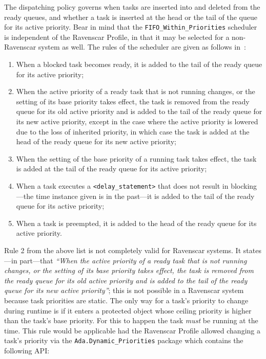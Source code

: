 The dispatching policy governs when tasks are inserted into and
deleted from the ready queues, and whether a task is inserted at the
head or the tail of the queue for its active priority. Bear in mind
that the \texttt{FIFO\_Within\_Priorities} scheduler is independent of
the Ravenscar Profile, in that it may be selected for a non-Ravenscar
system as well. The rules of the scheduler are given as follows
in~\cite{arm05}:

\begin{enumerate}
\item{When a blocked task becomes ready, it is added to the tail of
  the ready queue for its active priority;}
\item{When the active priority of a ready task that is not running
  changes, or the setting of its base priority takes effect, the task
  is removed from the ready queue for its old active priority and is
  added to the tail of the ready queue for its new active priority,
  except in the case where the active priority is lowered due to the
  loss of inherited priority, in which case the task is added at the
  head of the ready queue for its new active priority;}
\item{When the setting of the base priority of a running task takes
  effect, the task is added at the tail of the ready queue for its
  active priority;}
\item{When a task executes a \texttt{<delay\_statement>} that does not
  result in blocking---the time instance given is in the past---it is
  added to the tail of the ready queue for its active priority;}
\item{When a task is preempted, it is added to the head of the ready
  queue for its active priority.}
\end{enumerate}

Rule 2 from the above list is not completely valid for Ravenscar
systems. It states---in part---that \emph{``When the active priority
  of a ready task that is not running changes, or the setting of its
  base priority takes effect, the task is removed from the ready queue
  for its old active priority and is added to the tail of the ready
  queue for its new active priority''}; this is not possible in a
Ravenscar system because task priorities are static. The only way for
a task's priority to change during runtime is if it enters a protected
object whose ceiling priority is higher than the task's base
priority. For this to happen the task \emph{must} be running at the
time. This rule would be applicable had the Ravenscar Profile allowed
changing a task's priority via the \texttt{Ada.Dynamic\_Priorities}
package which contains the following API:

